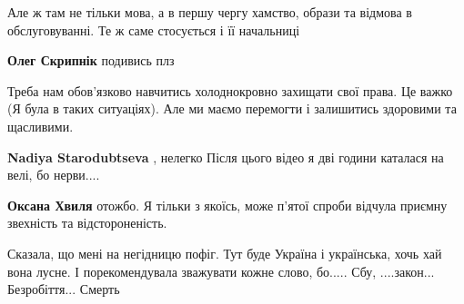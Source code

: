\begin{itemize}
\begin{itemize}
 
Але ж там не тільки мова, а в першу чергу хамство, образи та відмова в
обслуговуванні. Те ж саме стосується і її начальниці
\end{itemize}

 
\textbf{Олег Скрипнік} подивись плз

 

Треба нам обов'язково навчитись холоднокровно захищати свої права. Це важко (Я
була в таких ситуаціях). Але ми маємо перемогти і залишитись здоровими та
щасливими.

\begin{itemize}
 
\textbf{Nadiya Starodubtseva} , нелегко Після цього відео я дві години каталася на велі, бо нерви....

 
\textbf{Оксана Хвиля} отожбо.
Я тільки з якоїсь, може п'ятої спроби відчула приємну звехність та
відстороненість.

Сказала, що мені на негідницю пофіг. Тут буде Україна і українська, хочь хай
вона лусне. І порекомендувала зважувати кожне слово, бо..... Сбу, ....закон...
Безробіття... Смерть 🥰



\end{itemize}
\end{itemize}
